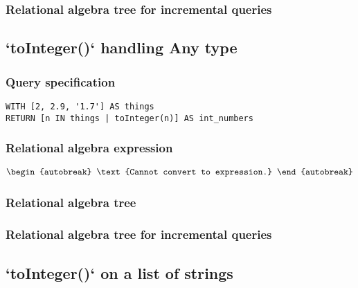 \subsubsection*{Relational algebra tree for incremental queries}


\subsection{`toInteger()` handling Any type}

\subsubsection*{Query specification}

\begin{lstlisting}
WITH [2, 2.9, '1.7'] AS things
RETURN [n IN things | toInteger(n)] AS int_numbers
\end{lstlisting}

\subsubsection*{Relational algebra expression}

\begin{align*}
\begin{autobreak}
\text{Cannot convert to expression.}
\end{autobreak}
\end{align*}

\subsubsection*{Relational algebra tree}


\subsubsection*{Relational algebra tree for incremental queries}


\subsection{`toInteger()` on a list of strings}

